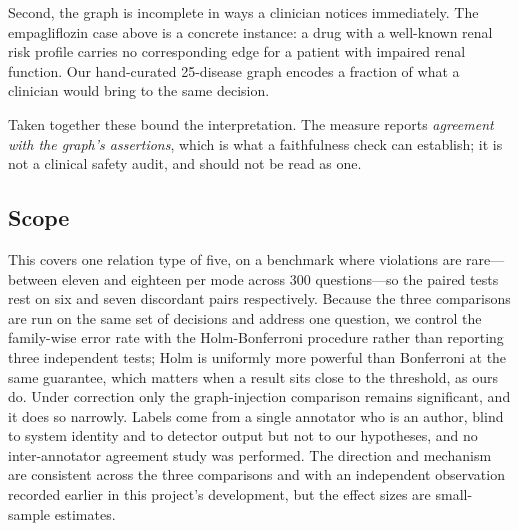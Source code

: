 Second, the graph is incomplete in ways a clinician notices immediately. The
empagliflozin case above is a concrete instance: a drug with a well-known renal
risk profile carries no corresponding edge for a patient with impaired renal
function. Our hand-curated 25-disease graph encodes a fraction of what a
clinician would bring to the same decision.

Taken together these bound the interpretation. The measure reports
\emph{agreement with the graph's assertions}, which is what a faithfulness
check can establish; it is not a clinical safety audit, and should not be read
as one.

\subsection{Scope}

This covers one relation type of five, on a benchmark where violations are
rare---between eleven and eighteen per mode across 300 questions---so the
paired tests rest on six and seven discordant pairs respectively. Because the
three comparisons are run on the same set of decisions and address one
question, we control the family-wise error rate with the Holm-Bonferroni
procedure rather than reporting three independent tests; Holm is uniformly
more powerful than Bonferroni at the same guarantee, which matters when a
result sits close to the threshold, as ours do. Under correction only the
graph-injection comparison remains significant, and it does so narrowly. Labels come
from a single annotator who is an author, blind to system identity and to
detector output but not to our hypotheses, and no inter-annotator agreement
study was performed. The direction and mechanism are consistent across the
three comparisons and with an independent observation recorded earlier in this
project's development, but the effect sizes are small-sample estimates.
